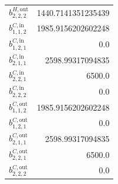 \documentclass{article}%
\begin{document}
\begin{multicols*}{3}
\begin{supertabular}{lr}
	$b_{2,2,2}^{H,\text{out}}$ & 1440.7141351235439 \\%
	$b_{1,1,2}^{C,\text{in}}$ & 1985.9156202602248 \\%
	$b_{1,2,1}^{C,\text{in}}$ & 0.0 \\%
	$b_{2,1,1}^{C,\text{in}}$ & 2598.99317094835 \\%
	$b_{2,2,1}^{C,\text{in}}$ & 6500.0 \\%
	$b_{2,2,2}^{C,\text{in}}$ & 0.0 \\%
	$b_{1,1,2}^{C,\text{out}}$ & 1985.9156202602248 \\%
	$b_{1,2,1}^{C,\text{out}}$ & 0.0 \\%
	$b_{2,1,1}^{C,\text{out}}$ & 2598.99317094835 \\%
	$b_{2,2,1}^{C,\text{out}}$ & 6500.0 \\%
	$b_{2,2,2}^{C,\text{out}}$ & 0.0 \\%
\end{supertabular}%
\end{multicols*}%
\end{document}

